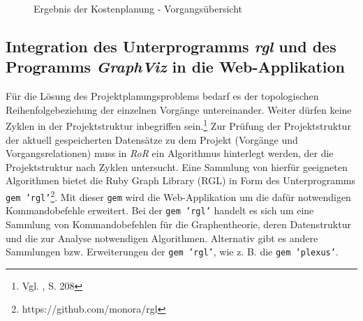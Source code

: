 \documentclass[a4paper,12pt,parskip,bibtotoc,liststotoc]{article}
\begin{document}
\begin{figure}[h!]
  \begin{center}
    \caption{Ergebnis der Kostenplanung - Vorgangsübersicht}  \label{VorKo}
  \end{center}
\end{figure}

\subsection{Integration des Unterprogramms \textit{rgl} und des Programms \textit{GraphViz} in die Web-Applikation}\label{rgl-kapitel}
Für die Lösung des Projektplanungsproblems bedarf es der topologischen Reihenfolgebeziehung der einzelnen Vorgänge untereinander. Weiter dürfen keine Zyklen in der Projektstruktur inbegriffen sein.\footnote{Vgl. \cite{Helber}, S. 208} Zur Prüfung der Projektstruktur der aktuell gespeicherten Datensätze zu dem Projekt (Vorgänge und Vorgangsrelationen) muss in \textit{RoR} ein Algorithmus hinterlegt werden, der die Projektstruktur nach Zyklen untersucht. Eine Sammlung von hierfür geeigneten Algorithmen bietet die Ruby Graph Library (RGL) in Form des Unterprogramms \texttt{gem 'rgl'}\footnote{https://github.com/monora/rgl}. Mit dieser \texttt{gem} wird die Web-Applikation um die dafür notwendigen Kommandobefehle erweitert. Bei der \texttt{gem 'rgl'} handelt es sich um eine Sammlung von Kommandobefehlen für die Graphentheorie, deren Datenstruktur und die zur Analyse notwendigen Algorithmen. Alternativ gibt es andere Sammlungen bzw. Erweiterungen der \texttt{gem 'rgl'}, wie z. B. die \texttt{gem 'plexus'}.\\
\end{document}

